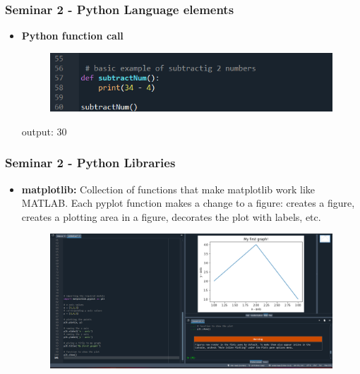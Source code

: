 \documentclass{beamer}
\begin{document}
\begin{frame}[fragile]
\frametitle{Seminar 2 - Python Language elements }
\begin{itemize}

\item \textbf{Python function call}\newline
 \begin{figure} 
   \includegraphics[width=0.8\linewidth]{Seminar_2_images/Python/b py 3.png}
   \end{figure}
   output: 30
\end{itemize}
\end{frame}
\begin{frame}
\frametitle{Seminar 2 - Python Libraries}
\begin{itemize}
\item \textbf{matplotlib:}\newline
Collection of functions that make matplotlib work like MATLAB.
Each pyplot function makes a change to a figure: creates a figure, creates a plotting area in a figure, decorates the plot with labels, etc.
\begin{figure}
\centering

   \includegraphics[width=0.9\linewidth]{Seminar_2_images/Python/b py 4.png}

\end{figure}
\end{itemize}
\end{frame}
\end{document}
